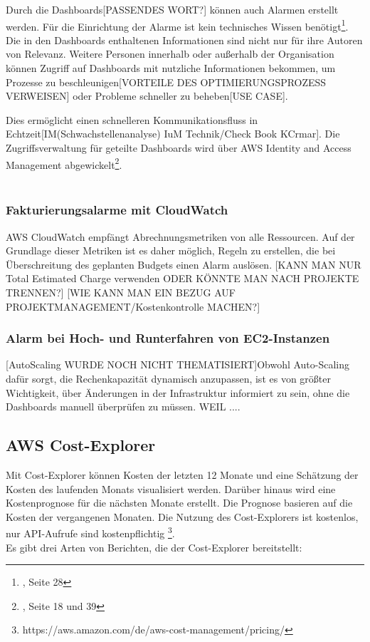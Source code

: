 Durch die Dashboards[PASSENDES WORT?] können auch Alarmen erstellt werden. Für die Einrichtung der Alarme ist kein technisches Wissen benötigt\footnote{\cite{AMZ14}, Seite 28}.
Die in den Dashboards enthaltenen Informationen sind nicht nur für ihre Autoren von Relevanz.
Weitere Personen innerhalb oder außerhalb der Organisation können Zugriff auf Dashboards mit nutzliche Informationen bekommen, um Prozesse zu beschleunigen[VORTEILE DES OPTIMIERUNGSPROZESS VERWEISEN] oder Probleme schneller zu beheben[USE CASE].

Dies ermöglicht einen schnelleren Kommunikationsfluss in Echtzeit[IM(Schwachstellenanalyse) IuM Technik/Check Book KCrmar]. Die Zugriffsverwaltung für geteilte Dashboards wird über AWS Identity and Access Management abgewickelt\footnote{\cite{AMZ14}, Seite 18 und 39}.
\\\\
\subsubsection{Fakturierungsalarme mit CloudWatch}
AWS CloudWatch empfängt Abrechnungsmetriken von alle Ressourcen. Auf der Grundlage dieser Metriken ist es daher möglich, Regeln zu erstellen, die bei Überschreitung des geplanten Budgets einen Alarm auslösen.
[KANN MAN NUR Total Estimated Charge verwenden ODER KÖNNTE MAN NACH PROJEKTE TRENNEN?]
[WIE KANN MAN EIN BEZUG AUF PROJEKTMANAGEMENT/Kostenkontrolle MACHEN?]

\subsubsection{Alarm bei Hoch- und Runterfahren von EC2-Instanzen}
[AutoScaling WURDE NOCH NICHT THEMATISIERT]Obwohl Auto-Scaling dafür sorgt, die Rechenkapazität dynamisch anzupassen, ist es von größter Wichtigkeit, über Änderungen in der Infrastruktur informiert zu sein, ohne die Dashboards manuell überprüfen zu müssen.
WEIL ....

\subsection{AWS Cost-Explorer}
Mit Cost-Explorer können Kosten der letzten 12 Monate und eine Schätzung der Kosten des laufenden Monats visualisiert werden. Darüber hinaus wird eine Kostenprognose für die nächsten Monate erstellt. Die Prognose basieren auf die Kosten der vergangenen Monaten.
Die Nutzung des Cost-Explorers ist kostenlos, nur API-Aufrufe sind kostenpflichtig \footnote{https://aws.amazon.com/de/aws-cost-management/pricing/}.
\\
Es gibt drei Arten von Berichten, die der Cost-Explorer bereitstellt:

